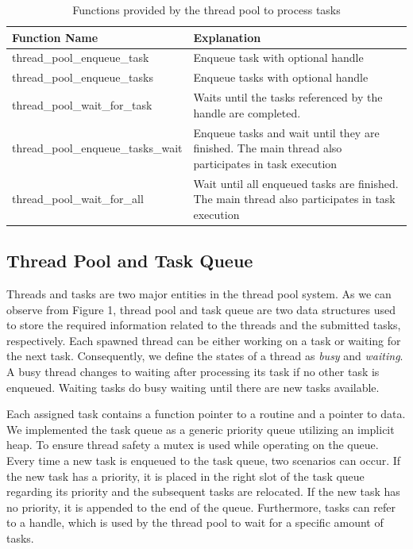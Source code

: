 \documentclass[conference]{IEEEtran}
\begin{document}
\begin{table}[htbp]
	\caption{Functions provided by the thread pool to process tasks}
	\begin{center}
		\begin{tabular}{ l l }
			\hline
			\textbf{Function Name}&\textbf{Explanation}\\
			\hline
			thread\_pool\_enqueue\_task & Enqueue task with optional handle \\
			thread\_pool\_enqueue\_tasks & Enqueue tasks with optional handle \\
			thread\_pool\_wait\_for\_task & Waits until the tasks referenced by the handle are completed. \\
			thread\_pool\_enqueue\_tasks\_wait & Enqueue tasks and wait until they are finished. The main thread also participates in task execution\\
			thread\_pool\_wait\_for\_all & Wait until all enqueued tasks are finished. The main thread also participates in task execution \\ \hline
		\end{tabular}
		\label{tab1}
	\end{center}
\end{table}

\subsection{Thread Pool and Task Queue}
Threads and tasks are two major entities in the thread pool system. As we can observe from Figure 1, thread pool and task queue are two data structures used to store the required information related to the threads and the submitted tasks, respectively. Each spawned thread can be either working on a task or waiting for the next task. Consequently, we define the states of a thread as \emph{busy} and \emph{waiting}. A busy thread changes to waiting after processing its task if no other task is enqueued. Waiting tasks do busy waiting until there are new tasks available.

Each assigned task contains a function pointer to a routine and a pointer to data. We implemented the task queue as a generic priority queue utilizing an implicit heap. To ensure thread safety a mutex is used while operating on the queue. Every time a new task is enqueued to the task queue, two scenarios can occur. If the new task has a priority, it is placed in the right slot of the task queue regarding its priority and the subsequent tasks are relocated. If the  new task has no priority, it is appended to the end of the queue. Furthermore, tasks can refer to a handle, which is used by the thread pool to wait for a specific amount of tasks.
\end{document}
